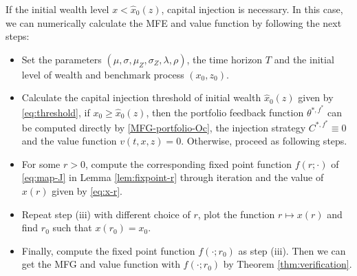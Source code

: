 \documentclass[11pt,times,letter]{article}
\numberwithin{equation}{section}
\begin{document}
If the initial wealth level $x< \hat{x}_0(z)$, capital injection is necessary. In this case, we can numerically calculate the MFE and value function by following the next steps:
\begin{itemize}
\item[(i)] Set the parameters $(\mu,\sigma,\mu_Z,\sigma_Z,\lambda,\rho)$, the time horizon $T$ and the initial level of wealth and benchmark process $(x_0,z_0)$.
\item [(ii)] Calculate the capital injection threshold of initial wealth $\hat{x}_0(z)$ given by \eqref{eq:threshold}, if $x_0\geq \hat{x}_0(z)$, then the portfolio feedback function $\theta^{*,f^*}$ can be computed directly by \eqref{MFG-portfolio-Oc}, the injection strategy $C^{*,f^*}\equiv 0$ and the value function $v(t,x,z)=0$. Otherwise, proceed as following steps.
\item[(iii)]For some $r>0$, compute the corresponding fixed point function $f(r;\cdot)$ of \eqref{eq:map-J} in Lemma \ref{lem:fixpoint-r} through iteration and the value of $x(r)$ given by \eqref{eq:x-r}.
\item [(iv)]Repeat step (iii) with different choice of $r$,  plot the function $r\mapsto x(r)$ and find $r_0$ such that $x(r_0)=x_0$. 
\item[(v)] Finally, compute the fixed point function $f(\cdot;r_0)$ as step (iii). Then we can get the MFG and value function with $f(\cdot;r_0)$ by Theorem \ref{thm:verification}.
\end{itemize}
\end{document}

